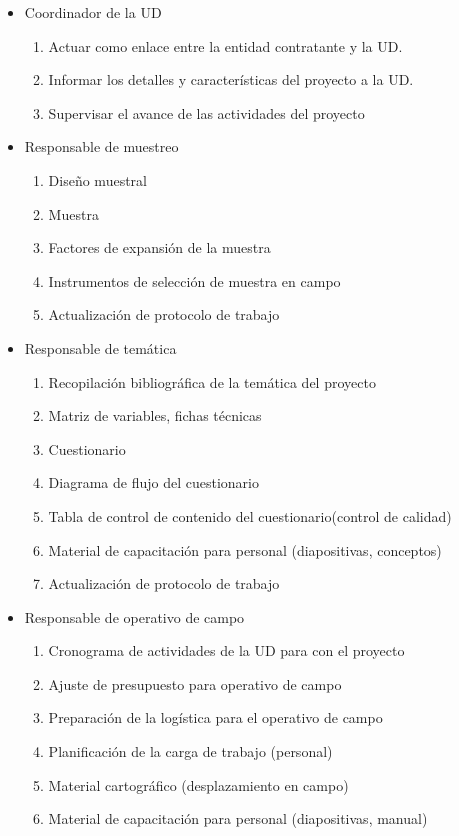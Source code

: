 \documentclass{article}
\begin{document}
\begin{itemize}
\item Coordinador de la UD
\begin{enumerate}
\item Actuar como enlace entre la entidad contratante y la UD. 
\item Informar los detalles y características del proyecto a la UD.
\item Supervisar el avance de las actividades del proyecto
\end{enumerate}
\item Responsable de muestreo
\begin{enumerate}
\item Diseño muestral
\item Muestra
\item Factores de expansión de la muestra 
\item Instrumentos de selección de muestra en campo
\item Actualización de protocolo de trabajo
\end{enumerate}
\item Responsable de temática
\begin{enumerate}
\item Recopilación bibliográfica de la temática del proyecto
\item Matriz de variables, fichas técnicas
\item Cuestionario
\item Diagrama de flujo del cuestionario 
\item Tabla de control de contenido del cuestionario(control de calidad)
\item Material de capacitación para personal (diapositivas, conceptos)
\item Actualización de protocolo de trabajo
\end{enumerate}
\item Responsable de operativo de campo
\begin{enumerate}
\item Cronograma de actividades de la UD para con el proyecto
\item Ajuste de presupuesto para operativo de campo
\item Preparación de la logística para el operativo de campo
\item Planificación de la carga de trabajo (personal)
\item Material cartográfico (desplazamiento en campo)
\item Material de capacitación para personal (diapositivas, manual)

\end{enumerate}
\end{itemize}
\end{document}
